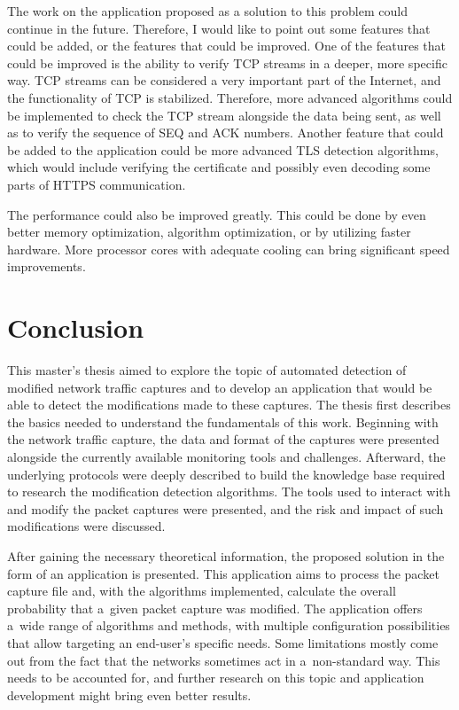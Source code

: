 \documentclass[
  printed,     %
  color,       %
  oneside,     %
  nosansbold,  %
  nocolorbold, %
  nolof,         %
  nolot,         %
]{fithesis4}
\begin{document}
The work on the application proposed as a solution to this problem could continue in the future. Therefore, I would like to point out some features that could be added, or the features that could be improved. One of the features that could be improved is the ability to verify TCP streams in a deeper, more specific way. TCP streams can be considered a very important part of the Internet, and the functionality of TCP is stabilized. Therefore, more advanced algorithms could be implemented to check the TCP stream alongside the data being sent, as well as to verify the sequence of SEQ and ACK numbers. Another feature that could be added to the application could be more advanced TLS detection algorithms, which would include verifying the certificate and possibly even decoding some parts of HTTPS communication. 

The performance could also be improved greatly. This could be done by even better memory optimization, algorithm optimization, or by utilizing faster hardware. More processor cores with adequate cooling can bring significant speed improvements.



\newpage
\chapter{Conclusion}

This master's thesis aimed to explore the topic of automated detection of modified network traffic captures and to develop an application that would be able to detect the modifications made to these captures. The thesis first describes the basics needed to understand the fundamentals of this work. Beginning with the network traffic capture, the data and format of the captures were presented alongside the currently available monitoring tools and challenges. Afterward, the underlying protocols were deeply described to build the knowledge base required to research the modification detection algorithms. The tools used to interact with and modify the packet captures were presented, and the risk and impact of such modifications were discussed. 

After gaining the necessary theoretical information, the proposed solution in the form of an application is presented. This application aims to process the packet capture file and, with the algorithms implemented, calculate the overall probability that a~given packet capture was modified. The application offers a~wide range of algorithms and methods, with multiple configuration possibilities that allow targeting an end-user's specific needs. Some limitations mostly come out from the fact that the networks sometimes act in a~non-standard way. This needs to be accounted for, and further research on this topic and application development might bring even better results. 
\end{document}
